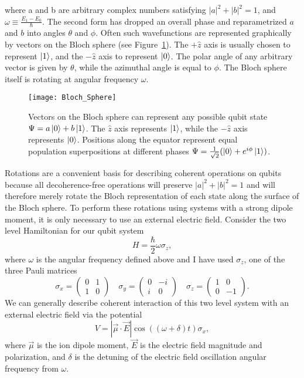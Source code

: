 where a and b are arbitrary complex numbers satisfying $\left| a \right|^2 + \left| b \right|^2 = 1$, and $\omega \equiv \frac{E_1 - E_0}{\hbar}$. The second form has dropped an overall phase and reparametrized $a$ and $b$ into angles $\theta$ and $\phi$.  Often such wavefunctions are represented graphically by vectors on the Bloch sphere (see Figure~\ref{fig:bloch}).  The $+\hat{z}$ axis is usually chosen to represent $\left| 1 \right>$, and the $-\hat{z}$ axis to represent $\left| 0 \right>$.  The polar angle of any arbitrary vector is given by $\theta$, while the azimuthal angle is equal to $\phi$.  The Bloch sphere itself is rotating at angular frequency $\omega$.

\begin{figure}
	\centering
	\texttt{[image: Bloch\_Sphere]}
	\caption[Bloch sphere representation of qubit wavefunction]{Vectors on the Bloch sphere can represent any possible qubit state $\Psi = a\left| 0 \right> + b\left| 1 \right>$. The $\hat{z}$ axis represents $\left| 1 \right>$, while the $-\hat{z}$ axis represents $\left| 0 \right>$.  Positions along the equator represent equal population superpositions at different phases $\Psi = \frac{1}{\sqrt{2}}( \left| 0 \right> + e^{i \phi} \left| 1 \right> )$.}
	\label{fig:bloch}
\end{figure}

Rotations are a convenient basis for describing coherent operations on qubits because all decoherence-free operations will preserve $\left| a \right|^2 + \left| b \right|^2 = 1$ and will therefore merely rotate the Bloch representation of each state along the surface of the Bloch sphere.  To perform these rotations using systems with a strong dipole moment, it is only necessary to use an external electric field.  Consider the two level Hamiltonian for our qubit system
\begin{equation}
H = \frac{\hbar}{2} \omega \sigma_z \mathrm{,}
\end{equation}
where $\omega$ is the angular frequency defined above and I have used $\sigma_z$, one of the three Pauli matrices
\[ 
\sigma_x = \left( \begin{array}{cc} 0 & 1 \\ 1 & 0 \end{array} \right) \quad
\sigma_y = \left( \begin{array}{cc} 0 & -i \\ i & 0 \end{array} \right) \quad
\sigma_z = \left( \begin{array}{cc} 1 & 0 \\ 0 & -1 \end{array} \right)\mathrm{.}
\]
We can generally describe coherent interaction of this two level system with an external electric field via the potential
\begin{equation}
	V = \left| \vec{\mu} \cdot \vec{E} \right| \cos{\left( (\omega + \delta) t \right)} \sigma_x \mathrm{,}
\end{equation}
where $\vec{\mu}$ is the ion dipole moment, $\vec{E}$ is the electric field magnitude and polarization, and $\delta$ is the detuning of the electric field oscillation angular frequency from $\omega$.

